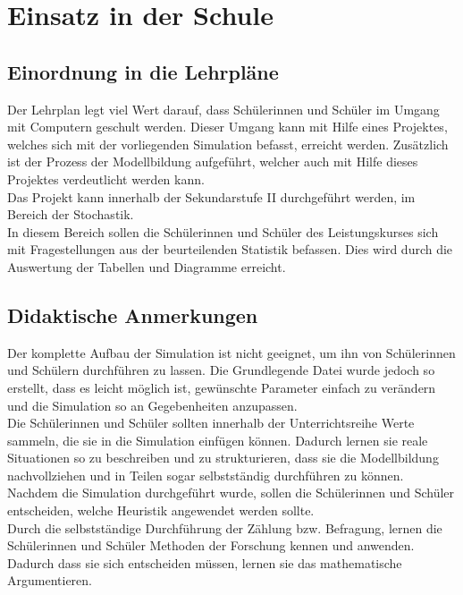 \section{Einsatz in der Schule}
\subsection{Einordnung in die Lehrpläne}

Der Lehrplan %
legt viel Wert darauf, dass Schülerinnen und Schüler im Umgang mit Computern geschult werden. Dieser Umgang kann mit Hilfe eines Projektes, welches sich mit der vorliegenden Simulation befasst, erreicht werden. Zusätzlich ist der Prozess der Modellbildung aufgeführt, welcher auch mit Hilfe dieses Projektes verdeutlicht werden kann.\\
Das Projekt kann innerhalb der Sekundarstufe II durchgeführt werden, im Bereich der Stochastik. \\
In diesem Bereich sollen die Schülerinnen und Schüler des Leistungskurses sich mit Fragestellungen aus der beurteilenden Statistik befassen. Dies wird durch die Auswertung der Tabellen und Diagramme erreicht. 

\subsection{Didaktische Anmerkungen}

Der komplette Aufbau der Simulation ist nicht geeignet, um ihn von Schülerinnen und Schülern durchführen zu lassen. Die Grundlegende Datei wurde jedoch so erstellt, dass es leicht möglich ist, gewünschte Parameter einfach zu verändern und die Simulation so an Gegebenheiten anzupassen.\\
Die Schülerinnen und Schüler sollten innerhalb der Unterrichtsreihe Werte sammeln, die sie in die Simulation einfügen können. Dadurch lernen sie reale Situationen so zu beschreiben und zu strukturieren, dass sie die Modellbildung nachvollziehen und in Teilen sogar selbstständig durchführen zu können.\\
Nachdem die Simulation durchgeführt wurde, sollen die Schülerinnen und Schüler entscheiden, welche Heuristik angewendet werden sollte. \\
Durch die selbstständige Durchführung der Zählung bzw. Befragung, lernen die Schülerinnen und Schüler Methoden der Forschung kennen und anwenden. Dadurch dass sie sich entscheiden müssen, lernen sie das mathematische Argumentieren.

